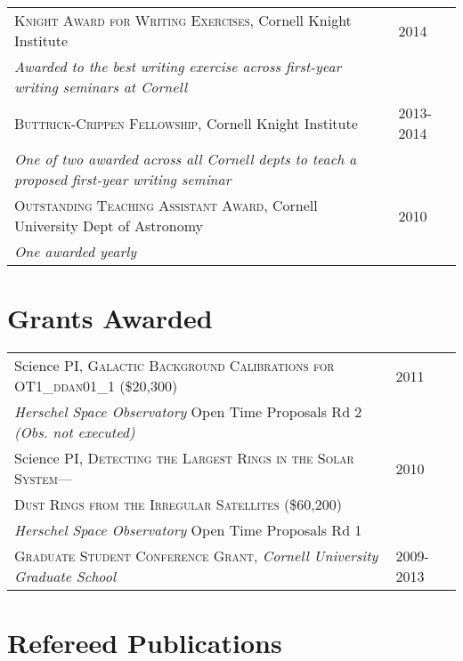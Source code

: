 \documentclass[10pt]{article} %
\begin{document}
\begin{tabular}{l>{\hfill}p{2.2cm}}
\textsc{Knight Award for Writing Exercises}, Cornell Knight Institute & 2014 \\
{\it Awarded to the best writing exercise across first-year writing seminars at Cornell} \\
\textsc{Buttrick-Crippen Fellowship}, Cornell Knight Institute & 2013-2014 \\
{\it One of two awarded across all Cornell depts to teach a proposed first-year writing seminar} \\
\textsc{Outstanding Teaching Assistant Award}, Cornell University Dept of Astronomy & 2010 \\
{\it One awarded yearly} \\
\end{tabular}



\section{Grants Awarded}

\begin{tabular}{l>{\hfill}p{2.4cm}}
Science PI, \textsc{Galactic Background Calibrations for OT1\_ddan01\_1} \footnotesize(\$20,300)\normalsize & 2011 \\
{\it Herschel Space Observatory} Open Time Proposals Rd 2 {\it (Obs. not executed)} \\
Science PI, \textsc{Detecting the Largest Rings in the Solar System---} & 2010 \\ 
\textsc{Dust Rings from the Irregular Satellites} \footnotesize(\$60,200)\normalsize \\
{\it Herschel Space Observatory} Open Time Proposals Rd 1 \\
\textsc{Graduate Student Conference Grant}, {\it Cornell University Graduate School} & 2009-2013\\
\end{tabular}


\section{Refereed Publications}
\end{document}
